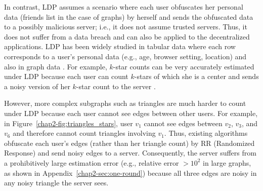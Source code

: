 In contrast, LDP assumes a scenario where each user obfuscates her personal data (friends list in 
the case of graphs) 
by herself and sends the obfuscated data to a possibly malicious server; i.e., it does not assume trusted servers.
Thus, it does not suffer from a data breach and can also be applied to the decentralized applications. 
LDP has been widely studied in tabular data where each row corresponds to a user's personal data (e.g., age, browser setting, location) 
\cite{Acharya_AISTATS19,Bassily_NIPS17,Erlingsson_CCS14,Kairouz_ICML16,Murakami_USENIX19,Wang_USENIX17} 
and also in graph data \cite{Imola_USENIX21,Qin_CCS17,Ye_ICDE20,Ye_TKDE21}.
For example, $k$-star counts can be very accurately estimated under LDP because each user can count $k$-stars of which she is a center and sends a noisy version of her $k$-star count to the server \cite{Imola_USENIX21}.

However, more complex subgraphs such as triangles are much harder to count under LDP because each user
cannot see
edges between other users.
For example, in Figure~\ref{chap2-fig:triangles_stars}, user $v_1$ cannot see
edges between $v_2$, $v_3$, and $v_6$ 
and therefore 
cannot count triangles involving $v_1$.
Thus,
existing algorithms \cite{Imola_USENIX21,Ye_ICDE20,Ye_TKDE21}
obfuscate each user's edges (rather than her triangle count) by
RR (Randomized Response)
\cite{Warner_JASA65} and send noisy edges to a server.
Consequently, the server suffers from a
prohibitively
large estimation error
(e.g., relative error $> 10^2$ in large graphs, 
as shown in Appendix~\ref{chap2-sec:one-round}) 
because all three edges are noisy in any noisy triangle the server sees.

